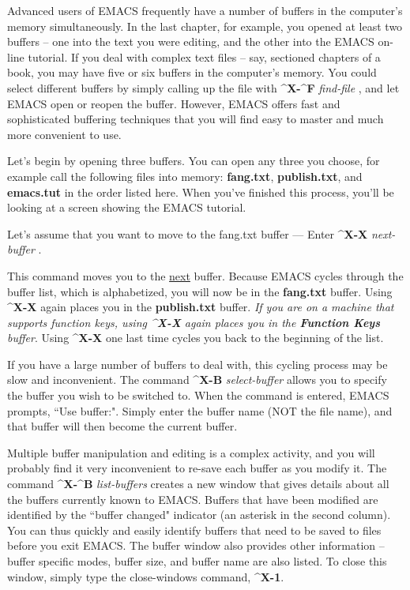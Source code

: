 Advanced users of EMACS frequently have a number of buffers in the
computer's memory simultaneously.  In the last chapter, for example,
you opened at least two buffers -- one into the text you were editing,
and the other into the EMACS on-line tutorial.  If you deal with
complex text files -- say, sectioned chapters of a book, you may have
five or six buffers in the computer's memory.  You could select
different buffers by simply calling up the file with
{\bf{}\^{}X-\^{}F} {\it{}find-file} , and let EMACS
open or reopen the buffer.  However, EMACS offers fast and
sophisticated buffering techniques that you will find easy to master
and much more convenient to use.

Let's begin by opening three buffers.  You can open any three you
choose, for example call the following files into memory: {\bf{}fang.txt},
{\bf{}publish.txt}, and {\bf{}emacs.tut} in the order listed here.  When
you've finished this process, you'll be looking at a screen showing the
EMACS tutorial.

Let's assume that you want to move to the fang.txt buffer --- Enter
{\bf{}\^{}X-X} {\it{}next-buffer} .

This command moves you to the \underline{next} buffer.  Because EMACS
cycles through the buffer list, which is alphabetized, you will now be
in the {\bf{}fang.txt} buffer. Using {\bf{}\^{}X-X} again places you
in the {\bf{}publish.txt} buffer. {\it{}If you are on a machine that
supports function keys, using {\bf{}\^{}X-X} again places you in the
{\bf{}Function Keys} buffer}. Using {\bf{}\^{}X-X} one last time
cycles you back to the beginning of the list.

If you have a large number of buffers to deal with, this cycling
process may be slow and inconvenient.  The command {\bf{}\^{}X-B}
{\it{}select-buffer}  allows you to specify the
buffer you wish to be switched to.  When the command is entered, EMACS
prompts, ``Use buffer:".  Simply enter the buffer name (NOT the file
name), and that buffer will then become the current buffer.

Multiple buffer manipulation and editing is a complex activity, and
you will probably find it very inconvenient to re-save each buffer as
you modify it.  The command {\bf{}\^{}X-\^{}B} {\it{}list-buffers}
 creates a new window that gives details about all
the buffers currently known to EMACS.  Buffers that have been modified
are identified by the ``buffer changed" indicator (an asterisk in the
second column).  You can thus quickly and easily identify buffers that
need to be saved to files before you exit EMACS.  The buffer window
also provides other information -- buffer specific modes, buffer size,
and buffer name are also listed.  To close this window, simply type
the close-windows command, {\bf{}\^{}X-1}.

